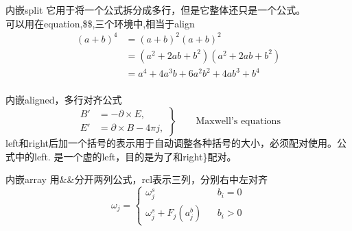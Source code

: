 \begin{frame}{内嵌split}
	它用于将一个公式拆分成多行，但是它整体还只是一个公式。\\可以用在equation,\$\$,\text{\ $[ \ $]}三个环境中,相当于align
	\begin{equation}
	 \begin{split}
	 (a + b)^4
	   &= (a + b)^2 (a + b)^2      \\
	   &= (a^2 + 2ab + b^2)	    	
		  (a^2 + 2ab + b^2)        \\
	   &= a^4 + 4a^3b + 6a^2b^2 + 4ab^3 + b^4\\
	 \end{split}
	\end{equation}
\end{frame}

\begin{frame}{内嵌aligned，多行对齐公式}
	\begin{equation}
		\left.\begin{aligned}
			   B'&=-\partial \times E,\\
			   E'&=\partial \times B - 4\pi j,
			  \end{aligned}
		\right\}
		\qquad \text{Maxwell's equations}
	   \end{equation}
	   left和right后加一个括号的表示用于自动调整各种括号的大小，必须配对使用。公式中的left. 是一个虚的left，目的是为了和right\}配对。
\end{frame}

\begin{frame}{内嵌array}
	用\&\&分开两列公式，rcl表示三列，分别右中左对齐
	\begin{equation}
		\omega_j=\left\{
		\begin{array}{rcl}
		\omega_j^s && b_i=0\\
		\omega_j^s+F_j(a_j^b) && b_i>0\tag{2.4}\label{2.4}	
		\end{array} \right.
		\end{equation}
\end{frame}